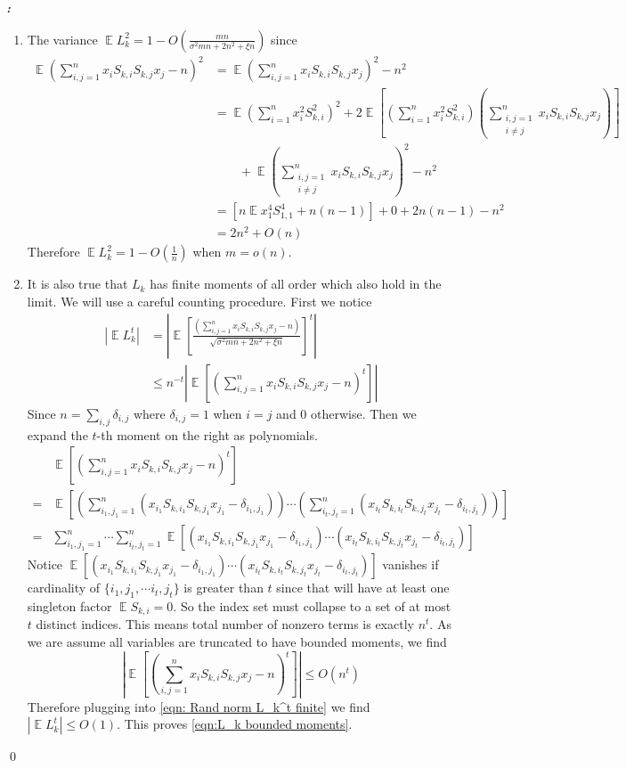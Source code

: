 \documentclass[12pt]{extarticle}
\renewenvironment{proof}[1][\proofname]{ { \it\bfseries #1: }}{\qed}
\newcommand{\1}{\field{1}}
\DeclareMathOperator{\E}{\mathbb{E}}
\numberwithin{equation}{section}
\begin{document}
\begin{proof}
\begin{enumerate}[label={(\arabic*)}]
\item The variance $\E L_k^2= 1 -O(\frac{mn}{\sigma^2 mn+2n^2 + \xi n}) $  since 
\begin{align*}
    \E(\sum_{i,j=1}^n x_i S_{k,i} S_{k,j}x_j -n)^2 & = \E(\sum_{i,j=1}^n x_i S_{k,i} S_{k,j}x_j )^2 - n^2 \\
    & = \E(\sum_{i=1}^n x_i^2 S_{k,i}^2 )^2+ 2 \E[(\sum_{i=1}^n x_i^2 S_{k,i}^2 )(\sum_{\substack{i,j=1\\ i\ne j}}^n x_i S_{k,i} S_{k,j}x_j)]\\
    & \qquad +\E(\sum_{\substack{i,j=1\\ i\ne j}}^n x_i S_{k,i} S_{k,j}x_j)^2 - n^2 \\
    & = [n\E x_1^4 S_{1,1}^4 +n(n-1)] +0 + 2n(n-1) -n^2 \\
    & = 2 n^2 +O(n)
\end{align*}
Therefore  $\E L_k^2= 1-O(\frac{1}{n})$ when $m=o(n)$.
\item It is also true that $L_k$ has finite moments of all order which also hold in the limit.
We will use a careful counting procedure. First we notice
\begin{align}
 | \E L_k^t |& = \left| \E \left[ \frac{(\sum_{i,j=1}^n x_i S_{k,i} S_{k,j}x_j -n)}{\sqrt{\sigma^2 mn+2n^2 + \xi n}} \right]^t  \right| \nonumber \\
 & \le n^{-t} \left| \E \left[ \left(\sum_{i,j=1}^n x_i S_{k,i} S_{k,j}x_j -n \right)^t \right] \right|
 \label{eqn: Rand norm L_k^t finite}
\end{align}
Since $n = \sum_{i,j}\delta_{i,j}$ where $\delta_{i,j}=1$ when $i=j$ and $0$ otherwise. Then we expand the $t$-th moment on the right as polynomials.
\begin{align*}
    & \E \left[ \left(\sum_{i,j=1}^n x_i S_{k,i} S_{k,j}x_j -n \right)^t\right] \\
    = & \E \left[ \left(\sum_{i_1,j_1=1}^n (x_{i_1} S_{k,i_1} S_{k,j_1}x_{j_1} -\delta_{i_1,j_1}) \right)\cdots \left(\sum_{i_t,j_t=1}^n (x_{i_t} S_{k,i_t} S_{k,j_t}x_{j_t} -\delta_{i_t,j_t}) \right)\right] \\
    = & \sum_{i_1,j_1=1}^n \cdots \sum_{i_t,j_t=1}^n  \E [(x_{i_1} S_{k,i_1} S_{k,j_1}x_{j_1} -\delta_{i_1,j_1}) \cdots  (x_{i_t} S_{k,i_t} S_{k,j_t}x_{j_t} -\delta_{i_t,j_t}) ]
\end{align*}
Notice  $\E [(x_{i_1} S_{k,i_1} S_{k,j_1}x_{j_1} -\delta_{i_1,j_1}) \cdots  (x_{i_t} S_{k,i_t} S_{k,j_t}x_{j_t} -\delta_{i_t,j_t}) ] $ vanishes if cardinality of $\{i_1, j_1, \cdots i_t, j_t \}$ is greater than $t$ since that will have at least one singleton factor $\E S_{k,i}=0$. So the index set must collapse to a set of at most $t$ distinct indices. This means total number of nonzero terms is exactly $n^t$. As we are assume all variables are truncated to have bounded moments, we find
\[
\left| \E \left[ \left(\sum_{i,j=1}^n x_i S_{k,i} S_{k,j}x_j -n \right)^t\right] \right| \le 
O(n^t)
\]
Therefore plugging into \cref{eqn: Rand norm L_k^t finite} we find $|\E L_k^t |\le O(1)$.
This proves \cref{eqn:L_k bounded moments}.


\end{enumerate}
\end{proof}
\end{document}
